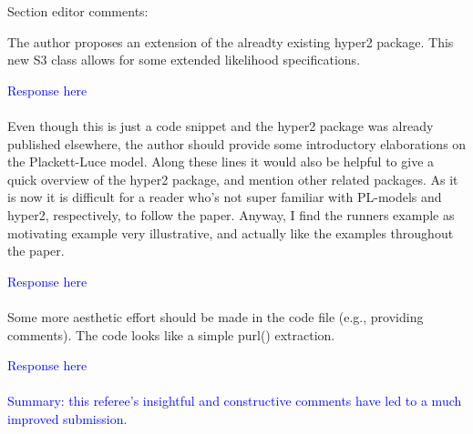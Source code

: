 \documentclass[12pt]{article}
\begin{document}
Section editor comments:

The author proposes an extension of the alreadty existing hyper2 package.
This new S3 class allows for some extended likelihood specifications.

\textcolor{blue}{Response here}\\ \\


Even though this is just a code snippet and the hyper2 package was already
published elsewhere, the author should provide some introductory elaborations
on the Plackett-Luce model. Along these lines it would also be helpful to give
a quick overview of the hyper2 package, and mention other related packages. As it
is now it is difficult for a reader who's not super familiar with PL-models and
hyper2, respectively, to follow the paper. Anyway, I find the runners example
as motivating example very illustrative, and actually like the examples throughout
the paper.

\textcolor{blue}{Response here}\\ \\

Some more aesthetic effort should be made in the code file (e.g., providing
comments). The code looks like a simple purl() extraction.

\textcolor{blue}{Response here}\\ \\


\textcolor{blue}{Summary: this referee's insightful and
  constructive comments have led to a much improved submission.}
\end{document}
